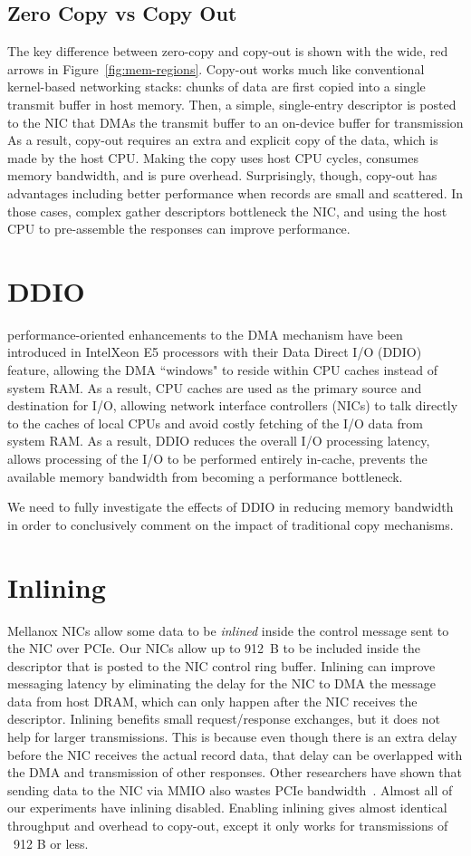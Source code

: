 \subsection{Zero Copy vs Copy Out}
The key difference between zero-copy and copy-out is shown with the wide, red
arrows in Figure~\ref{fig:mem-regions}. Copy-out works much like conventional
kernel-based networking stacks: chunks of data are first copied into a single
transmit buffer in host memory. Then, a simple, single-entry descriptor is
posted to the NIC that DMAs the transmit buffer to an on-device buffer for transmission
As a result, copy-out requires an extra and explicit copy of the data, which is made
by the host CPU.  Making the copy uses host CPU cycles, consumes memory
bandwidth, and is pure overhead. Surprisingly, though, copy-out has
advantages including better performance when
records are small and scattered.  In those cases, complex gather descriptors
bottleneck the NIC, and using the host CPU to pre-assemble the responses can
improve performance.



\section{DDIO}
performance-oriented enhancements to the DMA mechanism have been introduced in 
Intel\textregistered Xeon E5 processors with their Data Direct I/O (DDIO)~\cite{ddio} feature,
allowing the DMA ``windows" to reside within CPU caches instead of system RAM. As a result,
CPU caches are used as the primary source and destination for I/O, 
allowing network interface controllers (NICs) to talk directly to the caches of local CPUs
and avoid costly fetching of the I/O data from system RAM. As a result,
DDIO reduces the overall I/O processing latency, allows processing of the I/O 
to be performed entirely in-cache, prevents the  available memory bandwidth from becoming a performance bottleneck.

We need to fully investigate the effects of DDIO in reducing memory bandwidth 
in order to conclusively comment on the impact of traditional copy mechanisms.


\section{Inlining}
Mellanox NICs allow some data to be {\em inlined} inside the control message
sent to the NIC over PCIe. Our NICs allow up to 912~B to be included inside the
descriptor that is posted to the NIC control ring buffer.  Inlining can improve
messaging latency by eliminating the delay for the NIC to DMA the message data
from host DRAM, which can only happen after the NIC receives the descriptor.
Inlining benefits small request/response exchanges, but it does not help for
larger transmissions. This is because even though there is an extra delay
before the NIC receives the actual record data, that delay can be overlapped
with the DMA and transmission of other responses. Other researchers have shown
that sending data to the NIC via MMIO also wastes PCIe bandwidth~\cite{rdma}.
Almost all of our experiments have inlining disabled. Enabling inlining
gives almost identical throughput and overhead to copy-out, except it only
works for transmissions of ~912 B or less.